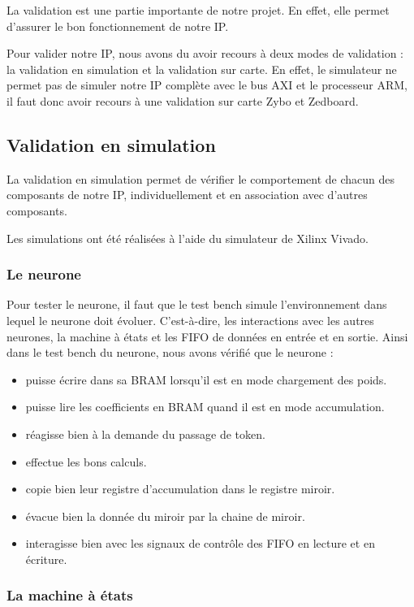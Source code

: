 La validation est une partie importante de notre projet. En effet, elle permet
d'assurer le bon fonctionnement de notre IP.

Pour valider notre IP, nous avons du avoir recours à deux modes de validation :
la validation en simulation et la validation sur carte.
En effet, le simulateur ne permet pas de simuler notre IP complète avec le bus
AXI et le processeur ARM, il faut donc avoir recours à une validation sur carte
Zybo et Zedboard.

\subsection{Validation en simulation}

La validation en simulation permet de vérifier le comportement de chacun des
composants de notre IP, individuellement et en association avec d'autres
composants.

Les simulations ont été réalisées à l'aide du simulateur de Xilinx Vivado.

\subsubsection{Le neurone}
Pour tester le neurone, il faut que le test bench simule l'environnement dans lequel
le neurone doit évoluer. C'est-à-dire, les interactions avec les autres neurones,
la machine à états et les FIFO de données en entrée et en sortie.
Ainsi dans le test bench du neurone, nous avons vérifié que le neurone :
\begin{itemize}
	\item puisse écrire dans sa BRAM lorsqu'il est en mode chargement des poids.
	\item puisse lire les coefficients en BRAM quand il est en mode accumulation.
	\item réagisse bien à la demande du passage de token.
	\item effectue les bons calculs.
	\item copie bien leur registre d'accumulation dans le registre miroir.
	\item évacue bien la donnée du miroir par la chaine de miroir.
	\item interagisse bien avec les signaux de contrôle des FIFO en lecture et en écriture.
\end{itemize}

\subsubsection{La machine à états}

